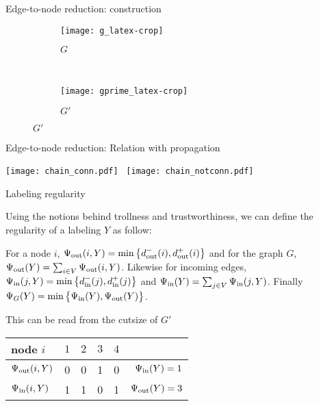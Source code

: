 \documentclass[svgnames,ignorenonframetext,final]{beamer}
\begin{document}
\begin{frame}{Edge-to-node reduction: construction}

\begin{figure}[t]
  \centering
  \begin{subfigure}[b]{0.45\textwidth}
    \centering \texttt{[image: g\_latex-crop]} \caption{$G$}
  \end{subfigure}~
  \begin{subfigure}[b]{0.45\textwidth}
    \centering \texttt{[image: gprime\_latex-crop]} \caption{$G'$}
  \end{subfigure}
\end{figure}

\end{frame}

\begin{frame}{Edge-to-node reduction: Relation with propagation}
  \begin{center}
    \texttt{[image: chain\_conn.pdf]}~
    \texttt{[image: chain\_notconn.pdf]}
  \end{center}
\end{frame}

\begin{frame}{Labeling regularity}

Using the notions behind trollness and trustworthiness, we can define
the regularity of a labeling \(Y\) as follow:

For a node \(i\),
$\Psi_{\mathrm{out}}(i, Y) = \min\big\{d_{\mathrm{out}}^-(i),d_{\mathrm{out}}^+(i)\big\}$ and for the
graph \(G\), $\Psi_{\mathrm{out}}(Y) = \sum_{i \in V} \Psi_{\mathrm{out}}(i,Y)$. Likewise for
incoming edges, \(\Psi_{\mathrm{in}}(j,Y) = \min\big\{d_{\mathrm{in}}^-(j),d_{\mathrm{in}}^+(j)\big\}\)
and \(\Psi_{\mathrm{in}}(Y) = \sum_{j \in V} \Psi_{\mathrm{in}}(j,Y)\). Finally
\(\Psi_G(Y) = \min\big\{\Psi_{\mathrm{in}}(Y), \Psi_{\mathrm{out}}(Y)\big\}\).

This can be read from the cutsize of \(G'\)

\begin{table}[htpb]
  \centering
  \begin{tabular}{lcccc|r}
    \toprule
    node $i$ & $1$ & $2$ & $3$ & $4$ & \\
    \midrule
    $\Psi_{\mathrm{out}}(i, Y)$ & 0 & 0 & 1 & 0 & $\Psi_{\mathrm{in}}(Y) = 1$ \\
    $\Psi_{\mathrm{in}}(i, Y)$  & 1 & 1 & 0 & 1 & $\Psi_{\mathrm{out}}(Y) = 3$ \\
    \bottomrule
  \end{tabular}
\end{table}

\end{frame}
\end{document}
